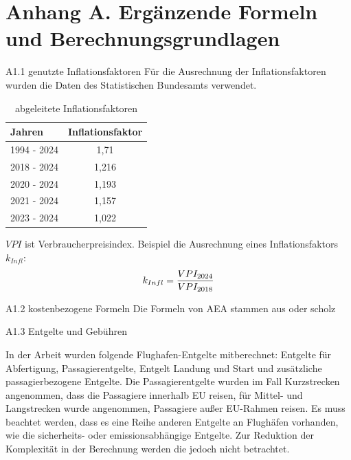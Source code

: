 \chapter{Anhang A. Ergänzende Formeln und Berechnungsgrundlagen}
A1.1 genutzte Inflationsfaktoren
Für die Ausrechnung der Inflationsfaktoren wurden die Daten des Statistischen Bundesamts verwendet. 
\begin{table}[h]
	\begin{center}
    \caption{abgeleitete Inflationsfaktoren}
	\label{Inflationsfaktoren}
	\begin{tabular}{|l|c|}
		\hline
		Jahren & \textbf{Inflationsfaktor} \\ \hline
		1994 - 2024 & 1,71 \\ \hline
		2018 - 2024 & 1,216 \\ \hline
		2020 - 2024 & 1,193 \\ \hline
        2021 - 2024 & 1,157 \\ \hline
        2023 - 2024 & 1,022 \\ \hline
	\end{tabular}
    \end{center}
\end{table}

$VPI$ ist Verbraucherpreisindex. Beispiel die Ausrechnung eines Inflationsfaktors $k_{Infl}$:
\begin{equation}
	{k_{Infl}} = \frac{VPI_{2024}}{VPI_{2018}} \\
	\label{inflation}
 \end{equation}

A1.2 kostenbezogene Formeln
Die Formeln von AEA stammen aus \cite{minwoo2019analysis} oder scholz

A1.3 Entgelte und Gebühren

In der Arbeit wurden folgende Flughafen-Entgelte mitberechnet: Entgelte für Abfertigung, Passagierentgelte, Entgelt Landung und Start
und zusätzliche passagierbezogene Entgelte. Die Passagierentgelte wurden im Fall Kurzstrecken angenommen,
dass die Passagiere innerhalb EU reisen, für Mittel- und Langstrecken wurde angenommen, Passagiere außer EU-Rahmen reisen.
Es muss beachtet werden, dass es eine Reihe anderen Entgelte an Flughäfen vorhanden, 
wie die sicherheits- oder emissionsabhängige Entgelte. Zur Reduktion der Komplexität in der Berechnung werden die jedoch nicht betrachtet.

